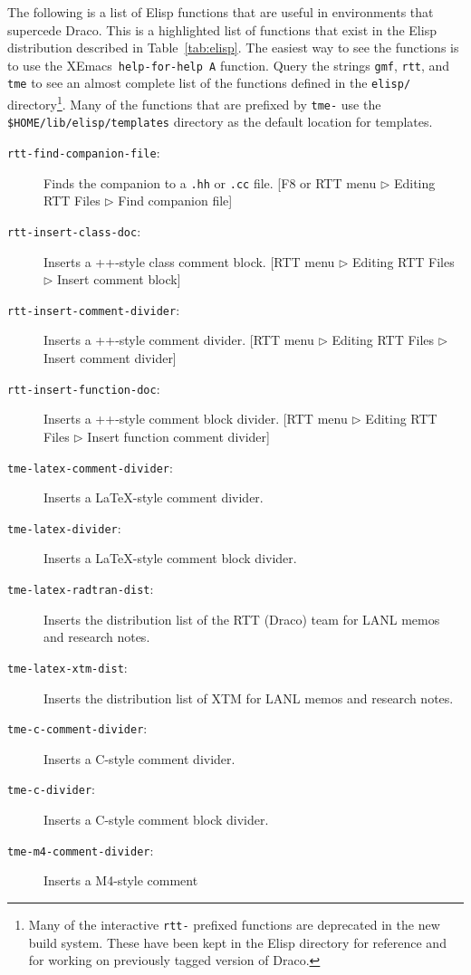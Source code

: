 \documentclass[11pt]{nmemo}
\newcommand{\comp}[1]{{\normalfont\texttt{\footnotesize{#1}}}}
\newcommand{\draco}{{\normalfont\sffamily Draco}}
\newcommand{\xemacs}{{\normalfont\sffamily XEmacs}}
\begin{document}
The following is a list of Elisp functions that are useful in
environments that supercede \draco.  This is a highlighted list of
functions that exist in the Elisp distribution described in
Table~\ref{tab:elisp}.  The easiest way to see the functions is to use
the \xemacs\ \comp{help-for-help A} function.  Query the strings
\comp{gmf}, \comp{rtt}, and \comp{tme} to see an almost complete list
of the functions defined in the \comp{elisp/} directory\footnote{Many
  of the interactive \comp{rtt-} prefixed functions are deprecated in
  the new build system.  These have been kept in the Elisp directory
  for reference and for working on previously tagged version of
  \draco.}.  Many of the functions that are prefixed by \comp{tme-}
use the \comp{\$HOME/lib/elisp/templates} directory as the default
location for templates.
\begin{description}
\item[\comp{rtt-find-companion-file}:] Finds the companion to a
  \comp{.hh} or \comp{.cc} file. [F8 or RTT menu $\triangleright$
  Editing RTT Files $\triangleright$ Find companion file]
\item[\comp{rtt-insert-class-doc}:] Inserts a \C++-style class comment 
  block. [RTT menu $\triangleright$
  Editing RTT Files $\triangleright$ Insert comment block]
\item[\comp{rtt-insert-comment-divider}:] Inserts a \C++-style comment 
  divider. [RTT menu $\triangleright$
  Editing RTT Files $\triangleright$ Insert comment divider]
\item[\comp{rtt-insert-function-doc}:] Inserts a \C++-style comment
  block divider. [RTT menu $\triangleright$
  Editing RTT Files $\triangleright$ Insert function comment divider]
\item[\comp{tme-latex-comment-divider}:] Inserts a \LaTeX-style comment
  divider.
\item[\comp{tme-latex-divider}:] Inserts a \LaTeX-style comment block 
  divider.
\item[\comp{tme-latex-radtran-dist}:] Inserts the distribution list of 
  the RTT (\draco) team for LANL memos and research notes.
\item[\comp{tme-latex-xtm-dist}:] Inserts the distribution list of XTM 
  for LANL memos and research notes.
\item[\comp{tme-c-comment-divider}:] Inserts a C-style comment
  divider.
\item[\comp{tme-c-divider}:] Inserts a C-style comment block divider.
\item[\comp{tme-m4-comment-divider}:] Inserts a M4-style comment

\end{description}
\end{document}
